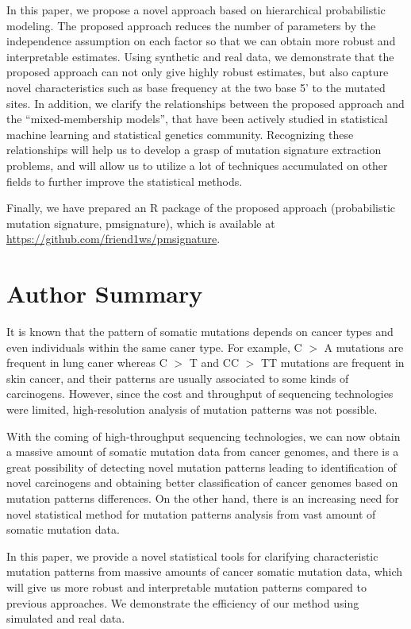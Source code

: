 In this paper, we propose a novel approach based on hierarchical probabilistic modeling.
The proposed approach reduces the number of parameters by the independence assumption on each factor 
so that we can obtain more robust and interpretable estimates.
Using synthetic and real data, we demonstrate that the proposed approach can not only give highly robust estimates,
but also capture novel characteristics such as base frequency at the two base 5' to the mutated sites.
In addition, we clarify the relationships between the proposed approach and the ``mixed-membership models'', 
that have been actively studied in statistical machine learning and statistical genetics community.
Recognizing these relationships will help us to develop a grasp of mutation signature extraction problems,
and will allow us to utilize a lot of techniques accumulated on other fields to further improve the statistical methods.

Finally, we have prepared an R package of the proposed approach (probabilistic mutation signature, pmsignature),
which is available at \url{https://github.com/friend1ws/pmsignature}.


\section*{Author Summary}

It is known that the pattern of somatic mutations depends on cancer types and even individuals within the same caner type.
For example, C $>$ A mutations are frequent in lung caner
whereas C $>$ T and CC $>$ TT mutations are frequent in skin cancer,
and their patterns are usually associated to some kinds of carcinogens.
However, since the cost and throughput of sequencing technologies were limited, 
high-resolution analysis of mutation patterns was not possible.

With the coming of high-throughput sequencing technologies, we can now obtain a massive amount of somatic mutation data from cancer genomes,
and there is a great possibility of detecting novel mutation patterns leading to identification of novel carcinogens
and obtaining better classification of cancer genomes based on mutation patterns differences.
On the other hand, there is an increasing need for novel statistical method for mutation patterns analysis 
from vast amount of somatic mutation data.

In this paper, we provide a novel statistical tools for clarifying characteristic mutation patterns
from massive amounts of cancer somatic mutation data, 
which will give us more robust and interpretable mutation patterns compared to previous approaches.
We demonstrate the efficiency of our method using simulated and real data.




